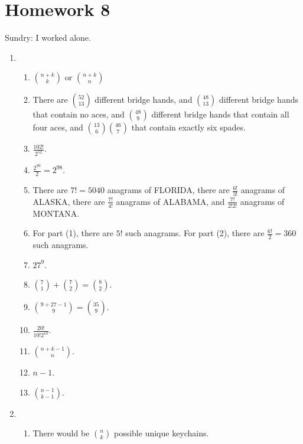 \section{Homework 8}
Sundry: I worked alone.

\begin{enumerate}
    \item \begin{enumerate}
        \item $\binom{n+k}{k}$ or $\binom{n+k}{n}$
        
        \item There are $\binom{52}{13}$ different bridge hands, and $\binom{48}{13}$ different bridge hands that contain no aces, and $\binom{48}{9}$ different bridge hands that contain all four aces, and $\binom{13}{6}\binom{46}{7}$ that contain exactly six spades.
        
        \item $\frac{102!}{2^{52}}$.
        
        \item $\frac{2^{99}}{2} = 2^{98}$.
        
        \item There are $7! = 5040$ anagrams of FLORIDA, there are $\frac{6!}{3!}$ anagrams of ALASKA, there are $\frac{7!}{4!}$ anagrams of ALABAMA, and $\frac{7!}{2!2!}$ anagrams of MONTANA.
        
        \item For part (1), there are $5!$ such anagrams. For part (2), there are $\frac{6!}{2} = 360$ such anagrams.
        
        \item $27^9$.
        
        \item $\binom{7}{1} + \binom{7}{2} = \binom{8}{2}$.
        
        \item $\binom{9+27-1}{9} = \binom{35}{9}$.
        
        \item $\frac{20!}{10!2^{10}}$.
        
        \item $\binom{n+k-1}{n}$.
        
        \item $n-1$.
        
        \item $\binom{n-1}{k-1}$.
    \end{enumerate}
    
    \item \begin{enumerate}
        \item There would be $\binom{n}{k}$ possible unique keychains.
        

\end{enumerate}
\end{enumerate}
